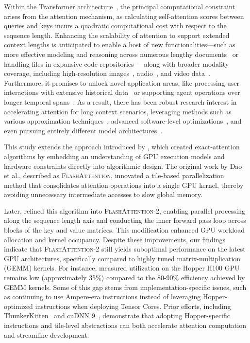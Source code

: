 Within the Transformer architecture~\citep{vaswani2017attention}, the principal computational constraint arises from the attention mechanism, as calculating self-attention scores between queries and keys incurs a quadratic computational cost with respect to the sequence length. Enhancing the scalability of attention to support extended context lengths is anticipated to enable a host of new functionalities—such as more effective modeling and reasoning across numerous lengthy documents~\citep{guo2021longt5,shaham2022scrolls,peng2023yarn} or handling files in expansive code repositories~\citep{roziere2023code, li2023starcoder}—along with broader modality coverage, including high-resolution images~\citep{chen2022scaling}, audio~\citep{gulati2020conformer}, and video data~\citep{ho2022video}. Furthermore, it promises to unlock novel application areas, like processing user interactions with extensive historical data~\citep{sun2019bert4rec} or supporting agent operations over longer temporal spans~\citep{yao2022react}. As a result, there has been robust research interest in accelerating attention for long context scenarios, leveraging methods such as various approximation techniques~\citep{katharopoulos2020transformers,choromanski2020rethinking, tay2020efficient}, advanced software-level optimizations~\citep{rabe2021self,dao2022flashattention,kwon2023efficient}, and even pursuing entirely different model architectures~\citep{peng2023rwkv,sun2023retentive,gu2023mamba}.

This study extends the approach introduced by \citet{dao2022flashattention}, which created exact-attention algorithms by embedding an understanding of GPU execution models and hardware constraints directly into algorithmic design. The original work by Dao et al., described as \textsc{FlashAttention}, innovated a tile-based parallelization method that consolidates attention operations into a single GPU kernel, thereby avoiding unnecessary intermediate accesses to slow global memory.

Later, \citet{dao2023flashattention2} refined this algorithm into \textsc{FlashAttention-2}, enabling parallel processing along the sequence length axis and conducting the inner forward pass loop across blocks of the key and value matrices. This modification enhanced GPU workload allocation and kernel occupancy. Despite these improvements, our findings indicate that \textsc{FlashAttention-2} still yields suboptimal performance on the latest GPU architectures, specifically compared to highly tuned matrix-multiplication (GEMM) kernels. For instance, measured utilization on the Hopper H100 GPU remains low (approximately 35\%) compared to the 80-90\% efficiency achieved by GEMM kernels. Some of this gap stems from implementation-specific issues, such as continuing to use Ampere-era instructions instead of leveraging Hopper-optimized instructions when deploying Tensor Cores. Prior efforts, including ThunkerKitten~\citep{spector2024thunder} and cuDNN 9~\citep{cudnn9}, demonstrate that adopting Hopper-specific instructions and tile-level abstractions can both accelerate attention computation and streamline development.


